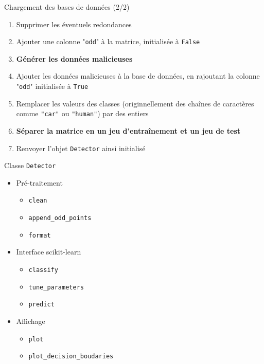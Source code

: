 \documentclass[usenames,dvipsnames]{beamer}
\begin{document}
\begin{frame}{Chargement des bases de données (2/2)}
\begin{enumerate}
\item Supprimer les éventuels redondances
\item Ajouter une colonne "\texttt{odd}" à la matrice, initialisée à \texttt{False}
\item \textbf{Générer les données malicieuses}
\item Ajouter les données malicieuses à la base de données, en rajoutant la colonne "\texttt{odd}" initialisée à \texttt{True}
\item Remplacer les valeurs des classes (originnellement des chaînes de caractères comme \texttt{"car"} ou \texttt{"human"}) par des entiers
\item \textbf{Séparer la matrice en un jeu d'entraînement et un jeu de test}
\item Renvoyer l'objet \texttt{Detector} ainsi initialisé
\end{enumerate}
\end{frame}

\begin{frame}{Classe \texttt{Detector}}
\begin{itemize}
\item Pré-traitement \begin{itemize}
\item \texttt{clean}
\item \texttt{append\_odd\_points}
\item \texttt{format}
\end{itemize}
\item Interface scikit-learn \begin{itemize}
\item \texttt{classify}
\item \texttt{tune\_parameters}
\item \texttt{predict}
\end{itemize}
\item Affichage \begin{itemize}
\item \texttt{plot}
\item  \texttt{plot\_decision\_boudaries}
\end{itemize}
\end{itemize}
\end{frame}
\end{document}
